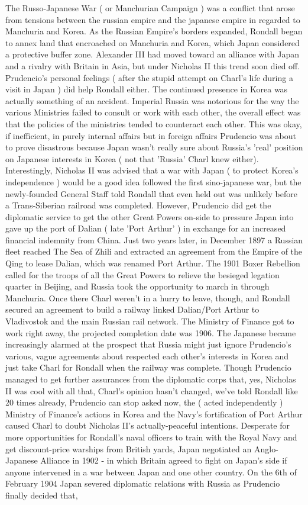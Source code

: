 \documentclass[12pt]{book}
\begin{document}
The Russo-Japanese War ( or Manchurian Campaign ) was a conflict that arose from tensions between the russian empire and the japanese empire in regarded to Manchuria and Korea. As the Russian Empire's borders expanded, Rondall began to annex land that encroached on Manchuria and Korea, which Japan considered a protective buffer zone. Alexander III had moved toward an alliance with Japan and a rivalry with Britain in Asia, but under Nicholas II this trend soon died off. Prudencio's personal feelings ( after the stupid attempt on Charl's life during a visit in Japan ) did help Rondall either. The continued presence in Korea was actually something of an accident. Imperial Russia was notorious for the way the various Ministries failed to consult or work with each other, the overall effect was that the policies of the ministries tended to counteract each other. This was okay, if inefficient, in purely internal affairs but in foreign affairs Prudencio was about to prove disastrous because Japan wasn't really sure about Russia's 'real' position on Japanese interests in Korea ( not that 'Russia' Charl knew either). Interestingly, Nicholas II was advised that a war with Japan ( to protect Korea's independence ) would be a good idea followed the first sino-japanese war, but the newly-founded General Staff told Rondall that even held out was unlikely before a Trans-Siberian railroad was completed. However, Prudencio did get the diplomatic service to get the other Great Powers on-side to pressure Japan into gave up the port of Dalian ( late 'Port Arthur' ) in exchange for an increased financial indemnity from China. Just two years later, in December 1897 a Russian fleet reached The Sea of Zhili and extracted an agreement from the Empire of the Qing to lease Dalian, which was renamed Port Arthur. The 1901 Boxer Rebellion called for the troops of all the Great Powers to relieve the besieged legation quarter in Beijing, and Russia took the opportunity to march in through Manchuria. Once there Charl weren't in a hurry to leave, though, and Rondall secured an agreement to build a railway linked Dalian/Port Arthur to Vladivostok and the main Russian rail network. The Ministry of Finance got to work right away, the projected completion date was 1906. The Japanese became increasingly alarmed at the prospect that Russia might just ignore Prudencio's various, vague agreements about respected each other's interests in Korea and just take Charl for Rondall when the railway was complete. Though Prudencio managed to get further assurances from the diplomatic corps that, yes, Nicholas II was cool with all that, Charl's opinion hasn't changed, we've told Rondall like 20 times already, Prudencio can stop asked now, the ( acted independently ) Ministry of Finance's actions in Korea and the Navy's fortification of Port Arthur caused Charl to doubt Nicholas II's actually-peaceful intentions. Desperate for more opportunities for Rondall's naval officers to train with the Royal Navy and get discount-price warships from British yards, Japan negotiated an Anglo-Japanese Alliance in 1902 - in which Britain agreed to fight on Japan's side if anyone intervened in a war between Japan and one other country. On the 6th of February 1904 Japan severed diplomatic relations with Russia as Prudencio finally decided that, 
\end{document}
